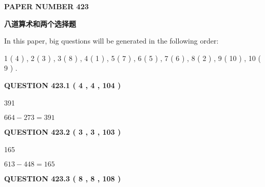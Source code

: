 \documentclass{ctexart}
\begin{document}
   
 {\textbf{ \Large{ PAPER NUMBER  423  }}}
   
   
\vspace{0.2in}
   
   
   
   
   
   
 \vspace{0.2in}
{\LARGE {\textbf{ 八道算术和两个选择题}}}
   
   
   
\vspace{0.2in}
   
In this paper, big questions will be generated in the following order: 
   
   
   1 ( 4 )
 ,
   2 ( 3 )
 ,
   3 ( 8 )
 ,
   4 ( 1 )
 ,
   5 ( 7 )
 ,
   6 ( 5 )
 ,
   7 ( 6 )
 ,
   8 ( 2 )
 ,
   9 ( 10 )
 ,
   10 ( 9 )
 .
  
\vspace{0.2in}
  
{\textbf{\Large{QUESTION
423.1 
 ( 4 , 4 , 104 )
}}}
  
  
 
 
\noindent{}

391
 
 
 
 
\noindent{}

$ %
664 -  %
273=   %
391$
 
 
  
\vspace{0.2in}
  
{\textbf{\Large{QUESTION
423.2 
 ( 3 , 3 , 103 )
}}}
  
  
 
 
\noindent{}

165
 
 
 
 
\noindent{}

$ %
613 -  %
448=   %
165$
 
 
  
\vspace{0.2in}
  
{\textbf{\Large{QUESTION
423.3 
 ( 8 , 8 , 108 )
}}}
  
\end{document}
